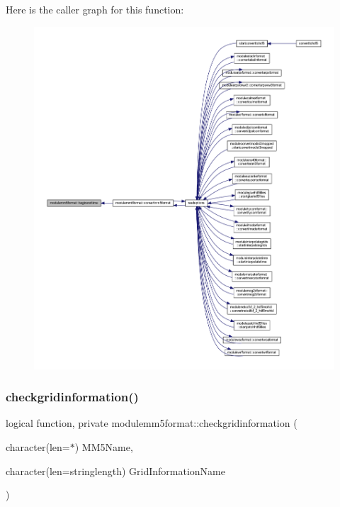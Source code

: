 Here is the caller graph for this function\+:\nopagebreak
\begin{figure}[H]
\begin{center}
\leavevmode
\includegraphics[width=350pt]{namespacemodulemm5format_a0c8ad12e555e63fe83da5b09ae5e7126_icgraph}
\end{center}
\end{figure}
\mbox{\label{namespacemodulemm5format_af3c3e0015f7df36b0498d741f6d745c3}} 
\subsubsection{\texorpdfstring{checkgridinformation()}{checkgridinformation()}}
{\footnotesize\ttfamily logical function, private modulemm5format\+::checkgridinformation (\begin{DoxyParamCaption}\item[{character(len=$\ast$)}]{M\+M5\+Name,  }\item[{character(len=stringlength)}]{Grid\+Information\+Name }\end{DoxyParamCaption})\hspace{0.3cm}{\ttfamily [private]}}

